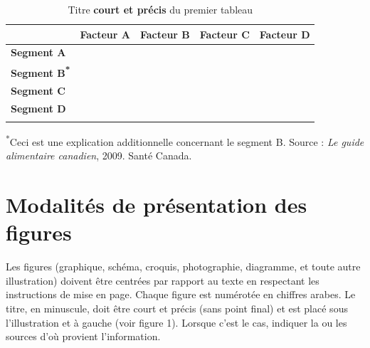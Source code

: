 \begin{table}[h] \renewcommand{\arraystretch}{0.75} \caption{Titre \textbf{court et précis} du premier tableau}
 {\begin{tabularx}{\linewidth}{YYYYY} \toprule & \textbf{Facteur A} & \textbf{Facteur B} &
\textbf{Facteur C} & \textbf{Facteur D} \\ \midrule \textbf{Segment A} & & & & \\ \addlinespace \textbf{Segment B\textsuperscript{*}} & & & & \\
\addlinespace \textbf{Segment C} & & & & \\ \addlinespace \textbf{Segment D} & & & & \\ \addlinespace \bottomrule \end{tabularx}} \newline
\textsuperscript{*}Ceci est une explication additionnelle concernant le segment B. \newline Source : \textit{Le guide alimentaire canadien}, 2009.
Santé Canada. \end{table}

\section*{Modalités de présentation des figures} 

Les figures (graphique, schéma, croquis, photographie, diagramme, et toute autre illustration) doivent être centrées par rapport au texte en
respectant les instructions de mise en page. Chaque figure est numérotée en chiffres arabes. Le titre, en minuscule, doit être court et précis (sans
point final) et est placé sous l'illustration et à gauche (voir figure 1). Lorsque c'est le cas, indiquer la ou les sources d'où provient
l'information.


